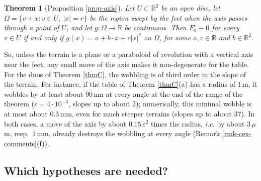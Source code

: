 \documentclass[a4paper,11pt,twoside,leqno]{article}
\newtheorem{teoalph}{Theorem}
\newcommand{\ie}[0]{\emph{i.e.} }
\newcommand{\eps}[0]{\varepsilon}
\newcommand{\rr}[0]{\ensuremath{\mathbb{R}}}
\numberwithin{equation}{section}
\begin{document}
\begin{teoalph}[Proposition \ref{prop-axis}]\label{thmD}
Let $U \subset \rr^2$ be an open disc, let $\Omega = \{v + x : v \in U,\ |x| = r\}$ be the region swept by the feet when the axis passes through a point of $U$, and let $g : \Omega \to \rr$ be continuous. Then $F_0^v \equiv 0$ for every $v \in U$ if and only if $g(x) = a + b \cdot x + c|x|^2$ on $\Omega$, for some $a, c \in \rr$ and $b \in \rr^2$.
\end{teoalph}

So, unless the terrain is a plane or a paraboloid of revolution with a vertical axis near the feet, any small move of the axis makes it non-degenerate for the table. For the duos of Theorem \ref{thmC}, the wobbling is of third order in the slope of the terrain. For instance, if the table of Theorem \ref{thmC}(a) has a radius of $1$\,m, it wobbles by at least about $90$\,nm at every angle at the end of the range of the theorem ($\eps = 4 \cdot 10^{-3}$, slopes up to about $2$\textdegree{}); numerically, this minimal wobble is at most about $0.3$\,mm, even for much steeper terrains (slopes up to about $37$\textdegree{}). In both cases, a move of the axis by about $0.15\,\eps^2$ times the radius, \ie by about $3\,\mu$m, resp.\ $1$\,mm, already destroys the wobbling at every angle (Remark \ref{rmk-cex-comments}(f)).

\subsection{Which hypotheses are needed?}\label{ss-intro-hyp}
\end{document}
